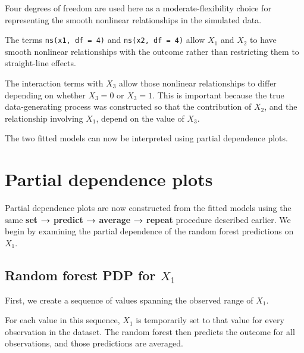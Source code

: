 \documentclass[
  letterpaper,
  DIV=11,
  numbers=noendperiod]{scrreprt}
\newenvironment{Shaded}{\begin{snugshade}}{\end{snugshade}}
\newcommand{\AttributeTok}[1]{\textcolor[rgb]{0.40,0.45,0.13}{#1}}
\newcommand{\DecValTok}[1]{\textcolor[rgb]{0.68,0.00,0.00}{#1}}
\newcommand{\FunctionTok}[1]{\textcolor[rgb]{0.28,0.35,0.67}{#1}}
\newcommand{\NormalTok}[1]{\textcolor[rgb]{0.00,0.23,0.31}{#1}}
\newcommand{\OtherTok}[1]{\textcolor[rgb]{0.00,0.23,0.31}{#1}}
\newcommand{\SpecialCharTok}[1]{\textcolor[rgb]{0.37,0.37,0.37}{#1}}
\begin{document}
Four degrees of freedom are used here as a moderate-flexibility choice
for representing the smooth nonlinear relationships in the simulated
data.

The terms \texttt{ns(x1,\ df\ =\ 4)} and \texttt{ns(x2,\ df\ =\ 4)}
allow \(X_1\) and \(X_2\) to have smooth nonlinear relationships with
the outcome rather than restricting them to straight-line effects.

The interaction terms with \(X_3\) allow those nonlinear relationships
to differ depending on whether \(X_3 = 0\) or \(X_3 = 1\). This is
important because the true data-generating process was constructed so
that the contribution of \(X_2\), and the relationship involving
\(X_1\), depend on the value of \(X_3\).

The two fitted models can now be interpreted using partial dependence
plots.

\section{Partial dependence plots}\label{partial-dependence-plots-1}

Partial dependence plots are now constructed from the fitted models
using the same \textbf{set → predict → average → repeat} procedure
described earlier. We begin by examining the partial dependence of the
random forest predictions on \(X_1\).

\subsection{\texorpdfstring{Random forest PDP for
\(X_1\)}{Random forest PDP for X\_1}}\label{random-forest-pdp-for-x_1}

First, we create a sequence of values spanning the observed range of
\(X_1\).

\begin{Shaded}
\end{Shaded}

For each value in this sequence, \(X_1\) is temporarily set to that
value for every observation in the dataset. The random forest then
predicts the outcome for all observations, and those predictions are
averaged.
\end{document}
